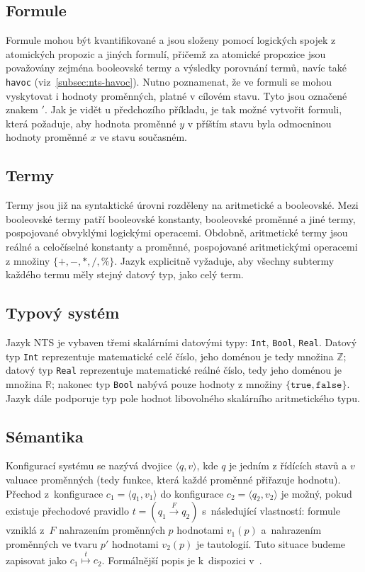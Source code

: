 \documentclass[12pt]{fithesis2}
\newcommand{\tuple}[1]{\langle #1 \rangle}
\begin{document}
\subsection{Formule}
Formule mohou být kvantifikované a jsou složeny pomocí logických spojek z atomických propozic a jiných formulí, přičemž za atomické propozice jsou považovány zejména booleovské termy a výsledky porovnání termů, navíc také \texttt{havoc} (viz~\ref{subsec:nts-havoc}). Nutno poznamenat, že ve formuli se mohou vyskytovat i hodnoty proměnných, platné v cílovém stavu. Tyto jsou označené znakem $'$. Jak je vidět u předchozího příkladu, je tak možné vytvořit formuli, která požaduje, aby hodnota proměnné $y$ v příštím stavu byla odmocninou hodnoty proměnné $x$ ve stavu současném.

\subsection{Termy}
Termy jsou již na syntaktické úrovni rozděleny na aritmetické a booleovské. Mezi booleovské termy patří booleovské konstanty, booleovské proměnné a jiné termy, pospojované obvyklými logickými operacemi. Obdobně, aritmetické termy jsou reálné a celočíselné konstanty a proměnné, pospojované aritmetickými operacemi z množiny $\{+, -, *, /, \% \}$. Jazyk explicitně vyžaduje, aby všechny subtermy každého termu měly stejný datový typ, jako celý term.

\subsection{Typový systém}
Jazyk NTS je vybaven třemi skalárními datovými typy: \texttt{Int}, \texttt{Bool}, \texttt{Real}. Datový typ \texttt{Int} reprezentuje matematické celé číslo, jeho doménou je tedy množina $\mathbb{Z}$; datový typ \texttt{Real} reprezentuje matematické reálné číslo, tedy jeho doménou je množina $\mathbb{R}$; nakonec typ \texttt{Bool} nabývá pouze hodnoty z množiny $\{ \texttt{true}, \texttt{false} \}$. Jazyk dále podporuje typ pole hodnot libovolného skalárního aritmetického typu.

\subsection{Sémantika}
\label{subsec:nts-configuration}

\newcommand{\rulemapsto}[1]{\overset{#1}{\mapsto}}
Konfigurací systému se nazývá dvojice $\tuple{q, v}$, kde $q$ je jedním z řídících stavů a $v$ valuace proměnných (tedy funkce, která každé proměnné přiřazuje hodnotu). Přechod z~konfigurace $c_1 = \tuple{q_1, v_1}$ do konfigurace $c_2 = \tuple{q_2, v_2}$ je možný, pokud existuje přechodové pravidlo $t = \left({q_1 \overset{F}{\rightarrow} q_2}\right)$ s~následující vlastností: formule vzniklá z~$F$ nahrazením proměnných $p$ hodnotami $v_1(p)$ a~nahrazením proměnných ve tvaru $p'$ hodnotami $v_2(p)$ je tautologií. Tuto situace budeme zapisovat jako $c_1 \rulemapsto{t} c_2$. Formálnější popis je k~dispozici v~\cite{NTSref}.
\end{document}
